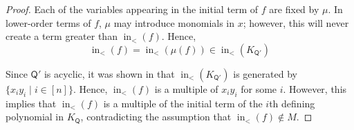 \documentclass[ALCO,published]{cedram}
\numberwithin{equation}{section}
\DeclareMathOperator{\In}{\mathrm{in}}
\newcommand{\1}{^{-1}}
\def\Q{\mathsf{Q}}
\begin{document}
\begin{proof}

Each of the variables appearing in the initial term of $f$ are fixed by $\mu$.  In lower-order terms of $f$, $\mu$ may introduce monomials in $x$; however, this will never create a term greater than $\In_<(f)$.  Hence, %
\[ \In_<(f) = \In_<(\mu(f)) \in \In_<(K_{\Q'})\]

Since $\Q'$ is acyclic, it was shown in \cite[Corollary 1.17]{BFZ05} that $\In_<(K_{\Q'})$ is generated by $\{x_iy_i \mid i\in [n]\}$.  Hence, $\In_<(f)$ is a multiple of $x_iy_i$ for some $i$.  However, this implies that $\In_<(f)$ is a multiple of the initial term of the $i$th defining polynomial in $K_\Q$, contradicting the assumption that $\In_<(f)\not\in M$.


\end{proof}
\end{document}
